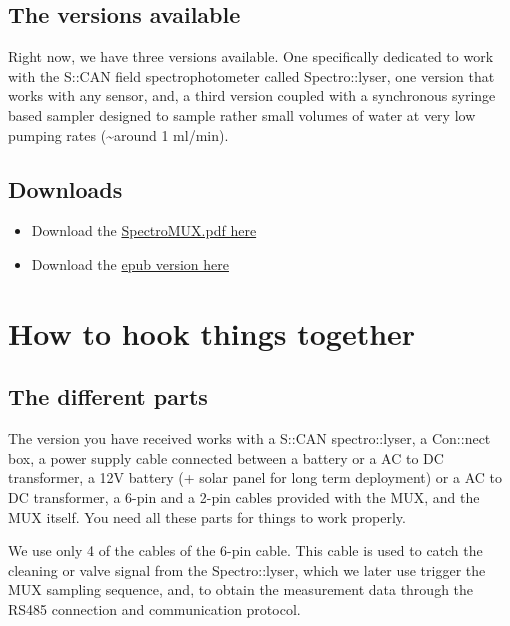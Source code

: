 \documentclass[]{book}
\begin{document}
\hypertarget{the-versions-available}{%
\section{The versions available}\label{the-versions-available}}

Right now, we have three versions available. One specifically dedicated to work with the S::CAN field spectrophotometer called Spectro::lyser, one version that works with any sensor, and, a third version coupled with a synchronous syringe based sampler designed to sample rather small volumes of water at very low pumping rates (\textasciitilde{}around 1 ml/min).

\hypertarget{downloads}{%
\section{Downloads}\label{downloads}}

\begin{itemize}
\item
  Download the \href{https://francoisbirgand.github.io/Multiplexo/MUXManual.pdf}{SpectroMUX.pdf here}
\item
  Download the \href{https://francoisbirgand.github.io/Multiplexo/MUXManual.epub}{epub version here}
\end{itemize}

\hypertarget{intro}{%
\chapter{How to hook things together}\label{intro}}

\hypertarget{the-different-parts}{%
\section{The different parts}\label{the-different-parts}}

The version you have received works with a S::CAN spectro::lyser, a Con::nect box, a power supply cable connected between a battery or a AC to DC transformer, a 12V battery (+ solar panel for long term deployment) or a AC to DC transformer, a 6-pin and a 2-pin cables provided with the MUX, and the MUX itself. You need all these parts for things to work properly.

We use only 4 of the cables of the 6-pin cable. This cable is used to catch the cleaning or valve signal from the Spectro::lyser, which we later use trigger the MUX sampling sequence, and, to obtain the measurement data through the RS485 connection and communication protocol.
\end{document}
